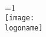 \textsc{{\LARGE \entitytitle}} \\ %
\vspace{5mm}
\ifnum\value{proof}=1
    \\[1.0 cm] %
\else
    \texttt{[image: \\logoname]}\\[1.0 cm] %
\fi

